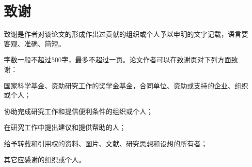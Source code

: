 \chapter*{致\quad\quad 谢}

致谢是作者对该论文的形成作出过贡献的组织或个人予以申明的文字记载，语言要客观、准确、简短。

字数一般不超过500字，最多不超过一页。论文作者可以在致谢页对下列方面致谢：

国家科学基金、资助研究工作的奖学金基金，合同单位、资助或支持的企业、组织或个人；

协助完成研究工作和提供便利条件的组织或个人；

在研究工作中提出建议和提供帮助的人；

给予转载和引用权的资料、图片、文献、研究思想和设想的所有者；

其它应感谢的组织或个人。
